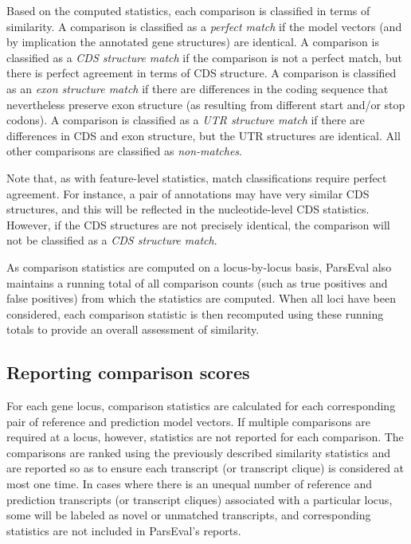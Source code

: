 Based on the computed statistics, each comparison is classified in terms of similarity.
A comparison is classified as a \emph{perfect match} if the model vectors (and by implication the annotated gene structures) are identical.
A comparison is classified as a \emph{CDS structure match} if the comparison is not a perfect match, but there is perfect agreement in terms of CDS structure.
A comparison is classified as an \emph{exon structure match} if there are differences in the coding sequence that nevertheless preserve exon structure (as resulting from different start and/or stop codons).
A comparison is classified as a \emph{UTR structure match} if there are differences in CDS and exon structure, but the UTR structures are identical.
All other comparisons are classified as \emph{non-matches}.

Note that, as with feature-level statistics, match classifications require perfect agreement.
For instance, a pair of annotations may have very similar CDS structures, and this will be reflected in the nucleotide-level CDS statistics.
However, if the CDS structures are not precisely identical, the comparison will not be classified as a \emph{CDS structure match}.

As comparison statistics are computed on a locus-by-locus basis, ParsEval also maintains a running total of all comparison counts (such as true positives and false positives) from which the statistics are computed.
When all loci have been considered, each comparison statistic is then recomputed using these running totals to provide an overall assessment of similarity.


\subsection{Reporting comparison scores}
For each gene locus, comparison statistics are calculated for each corresponding pair of reference and prediction model vectors.
If multiple comparisons are required at a locus, however, statistics are not reported for each comparison.
The comparisons are ranked using the previously described similarity statistics and are reported so as to ensure each transcript (or transcript clique) is considered at most one time.
In cases where there is an unequal number of reference and prediction transcripts (or transcript cliques) associated with a particular locus, some will be labeled as novel or unmatched transcripts, and corresponding statistics are not included in ParsEval's reports.

